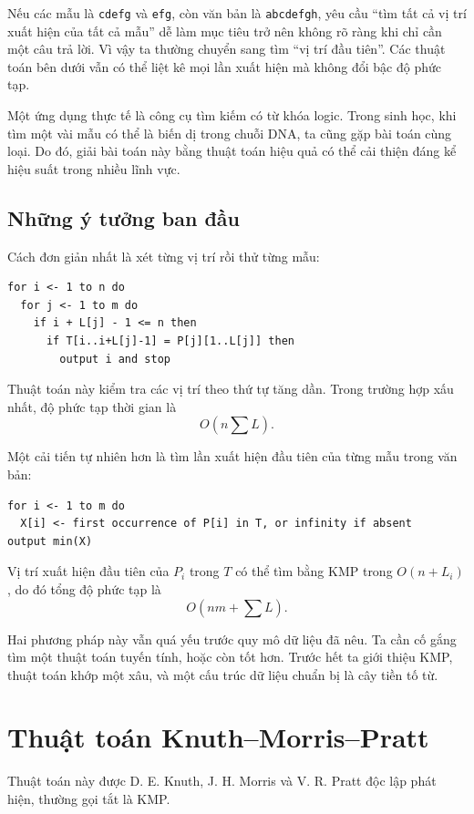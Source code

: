 \documentclass[11pt]{article}
\begin{document}
Nếu các mẫu là \texttt{cdefg} và \texttt{efg}, còn văn bản là
\texttt{abcdefgh}, yêu cầu ``tìm tất cả vị trí xuất hiện của tất cả mẫu'' dễ
làm mục tiêu trở nên không rõ ràng khi chỉ cần một câu trả lời. Vì vậy ta
thường chuyển sang tìm ``vị trí đầu tiên''. Các thuật toán bên dưới vẫn có thể
liệt kê mọi lần xuất hiện mà không đổi bậc độ phức tạp.

Một ứng dụng thực tế là công cụ tìm kiếm có từ khóa logic. Trong sinh học, khi
tìm một vài mẫu có thể là biến dị trong chuỗi DNA, ta cũng gặp bài toán cùng
loại. Do đó, giải bài toán này bằng thuật toán hiệu quả có thể cải thiện đáng
kể hiệu suất trong nhiều lĩnh vực.

\subsection{Những ý tưởng ban đầu}

Cách đơn giản nhất là xét từng vị trí rồi thử từng mẫu:

\begin{verbatim}
for i <- 1 to n do
  for j <- 1 to m do
    if i + L[j] - 1 <= n then
      if T[i..i+L[j]-1] = P[j][1..L[j]] then
        output i and stop
\end{verbatim}

Thuật toán này kiểm tra các vị trí theo thứ tự tăng dần. Trong trường hợp xấu
nhất, độ phức tạp thời gian là
\[
  O\left(n\sum L\right).
\]

Một cải tiến tự nhiên hơn là tìm lần xuất hiện đầu tiên của từng mẫu trong
văn bản:

\begin{verbatim}
for i <- 1 to m do
  X[i] <- first occurrence of P[i] in T, or infinity if absent
output min(X)
\end{verbatim}

Vị trí xuất hiện đầu tiên của $P_i$ trong $T$ có thể tìm bằng KMP trong
$O(n+L_i)$, do đó tổng độ phức tạp là
\[
  O\left(nm+\sum L\right).
\]

Hai phương pháp này vẫn quá yếu trước quy mô dữ liệu đã nêu. Ta cần cố gắng
tìm một thuật toán tuyến tính, hoặc còn tốt hơn. Trước hết ta giới thiệu KMP,
thuật toán khớp một xâu, và một cấu trúc dữ liệu chuẩn bị là cây tiền tố từ.

\section{Thuật toán Knuth--Morris--Pratt}

Thuật toán này được D. E. Knuth, J. H. Morris và V. R. Pratt độc lập phát
hiện, thường gọi tắt là KMP.
\end{document}
